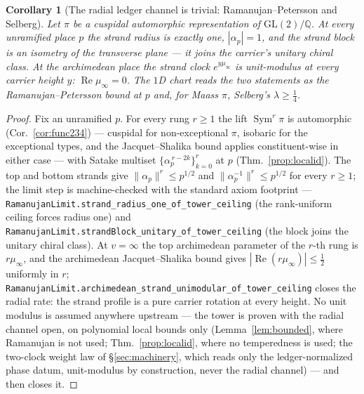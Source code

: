 \documentclass[11pt]{article}
\newtheorem{corollary}[theorem]{Corollary}
\theoremstyle{definition}
\newcommand{\Sym}{\operatorname{Sym}}
\begin{document}
\begin{corollary}[The radial ledger channel is trivial: Ramanujan--Petersson and Selberg]\label{cor:ramanujan}
Let $\pi$ be a cuspidal automorphic representation of $\mathrm{GL}(2)/\mathbb Q$. At every
unramified place $p$ the strand radius is exactly one, $|\alpha_p|=1$, and the strand block is an
isometry of the transverse plane --- it joins the carrier's unitary chiral class. At the
archimedean place the strand clock $e^{y\mu_\infty}$ is unit-modulus at every carrier height $y$:
$\operatorname{Re}\mu_\infty=0$. The $1$D chart reads the two statements as the
Ramanujan--Petersson bound at $p$ and, for Maass $\pi$, Selberg's $\lambda\ge\tfrac14$.
\end{corollary}

\begin{proof}
Fix an unramified $p$. For every rung $r\ge1$ the lift $\Sym^r\pi$ is automorphic
(Cor.~\ref{cor:func234}) --- cuspidal for non-exceptional $\pi$, isobaric for the exceptional
types, and the Jacquet--Shalika bound \cite{JS} applies constituent-wise in either case --- with
Satake multiset $\{\alpha_p^{\,r-2k}\}_{k=0}^{r}$ at $p$ (Thm.~\ref{prop:localid}). The top and
bottom strands give $\|\alpha_p\|^{r}\le p^{1/2}$ and $\|\alpha_p^{-1}\|^{r}\le p^{1/2}$ for
every $r\ge1$; the limit step is machine-checked with the standard axiom footprint ---
\texttt{RamanujanLimit.strand\_radius\_one\_of\_tower\_ceiling} (the rank-uniform ceiling forces
radius one) and \texttt{RamanujanLimit.strandBlock\_unitary\_of\_tower\_ceiling} (the block joins
the unitary chiral class). At $v=\infty$ the top archimedean parameter of the $r$-th rung is
$r\mu_\infty$, and the archimedean Jacquet--Shalika bound gives
$|\operatorname{Re}(r\mu_\infty)|\le\tfrac12$ uniformly in $r$;
\texttt{RamanujanLimit.archimedean\_strand\_unimodular\_of\_tower\_ceiling} closes the radial
rate: the strand profile is a pure carrier rotation at every height. No unit modulus is assumed
anywhere upstream --- the tower is proven with the radial channel open, on polynomial local
bounds only (Lemma~\ref{lem:bounded}, where Ramanujan is not used; Thm.~\ref{prop:localid},
where no temperedness is used; the two-clock weight law of \S\ref{sec:machinery}, which reads only
the ledger-normalized phase datum, unit-modulus by construction, never the radial channel) --- and
then closes it.
\end{proof}
\end{document}
